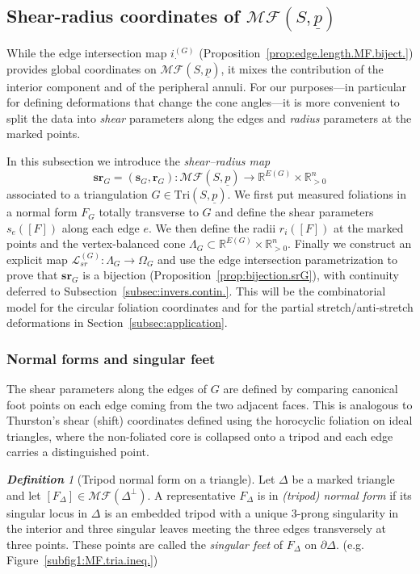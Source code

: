 \documentclass[11pt, letterpaper]{amsart}
\theoremstyle{definition}
\theoremstyle{remark}
\newtheorem{definition}[theorem]{\rm\bf Definition}
\newcommand{\up}{\underline{p}}
\newcommand{\Sp}{(S,\up)}
\newcommand{\TSp}{\text{Tri}\Sp}
\newcommand{\iG}{i^{(G)}}
\newcommand{\cMF}{\mathcal{MF}}
\newcommand{\cMFp}{\mathcal{MF} (S,\up)}
\newcommand{\bR}{\mathbb{R}}
\newcommand{\DEF}{} \newcommand{\WARN}{\textcolor{red}} \newcommand{\ALT}{\textcolor{brown}} \newcommand{\TODO}{\textcolor{teal}} %
\numberwithin{equation}{section}
\begin{document}
\subsection{Shear-radius coordinates of \texorpdfstring{\(\cMFp\)}{MF(S,\underline p)}}
\label{subsec:MF.shear.radius}

While the edge intersection map \(\iG_{\cdot}\) (Proposition~\ref{prop:edge.length.MF.biject.}) provides global coordinates on \(\cMFp\), it mixes the contribution of the interior component and of the peripheral annuli.
For our purposes---in particular for defining deformations that change the cone angles---it is more convenient to split the data into \emph{shear} parameters along the edges and \emph{radius} parameters at the marked points.

In this subsection we introduce the \emph{shear--radius map}
\[
\mathbf{sr}_G = (\mathbf{s}_G,\mathbf{r}_G): \cMFp \longrightarrow \bR^{E(G)} \times \bR_{>0}^n
\]
associated to a triangulation \(G\in\TSp\).
We first put measured foliations in a normal form \(F_G\) totally transverse to \(G\) and define the shear parameters \(s_e([F])\) along each edge \(e\).
We then define the radii \(r_i([F])\) at the marked points and the vertex-balanced cone \(\Lambda_G\subset\bR^{E(G)}\times\bR_{>0}^n\).
Finally we construct an explicit map \(\mathcal{L}^{(G)}_{sr}:\Lambda_G\to\Omega_G\) and use the edge intersection parametrization to prove that \(\mathbf{sr}_G\) is a bijection (Proposition~\ref{prop:bijection.srG}), with continuity deferred to Subsection~\ref{subsec:invers.contin.}.
This will be the combinatorial model for the circular foliation coordinates and for the partial stretch/anti-stretch deformations in Section~\ref{subsec:application}.

\subsubsection{Normal forms and singular feet}

The shear parameters along the edges of \(G\) are defined by comparing canonical
foot points on each edge coming from the two adjacent faces.  This is analogous to
Thurston's shear (shift) coordinates defined using the horocyclic foliation on ideal
triangles, where the non-foliated core is collapsed onto a tripod and each edge carries
a distinguished point. 

\begin{definition}[Tripod normal form on a triangle]
\label{def:normal.form.triangle}
Let \(\Delta\) be a marked triangle and let \([F_\Delta]\in \cMF(\Delta^\perp)\).
A representative \(F_\Delta\) is in \DEF{\em (tripod) normal form} if its singular locus in \(\Delta\) is an embedded tripod with a unique \(3\)-prong singularity in the interior and three singular leaves meeting the three edges transversely at three points.  
These points are called the \DEF{\em singular feet} of \(F_\Delta\) on \(\partial\Delta\). 
(e.g. Figure~\ref{subfig1:MF.tria.ineq.})
\end{definition}
\end{document}
